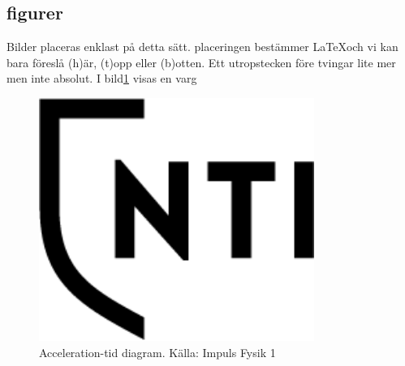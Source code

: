 \documentclass[11p]{article}
\begin{document}
    \subsection{figurer}
    Bilder placeras enklast på detta sätt. placeringen bestämmer \LaTeX och vi kan bara föreslå (h)är, (t)opp eller (b)otten. Ett utropstecken före tvingar lite mer men inte absolut. I bild\ref{varg} visas en varg
    \begin{figure}[!h]
        \includegraphics[width=0.8\textwidth]{NTI Gymnasiet_Symbol_print_svart}
        \caption{Acceleration-tid diagram. Källa: Impuls Fysik 1}
        \label{varg}
    \end{figure}
    \printbibliography
\end{document}
